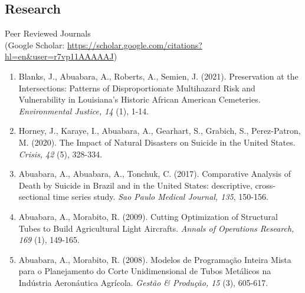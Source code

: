 \documentclass[11pt,oneside]{article}
\begin{document}
\subsection*{Research}

{Peer Reviewed Journals}\\{\small (Google Scholar: \url{https://scholar.google.com/citations?hl=en&user=r7vp11AAAAAJ})}
\begin{enumerate}[leftmargin=20pt]
\item Blanks, J., Abuabara, A., Roberts, A., Semien, J. (2021). Preservation at the Intersections: Patterns of Disproportionate Multihazard Risk and Vulnerability in Louisiana's Historic African American Cemeteries. \emph{Environmental Justice, 14} (1), 1-14.
\item Horney, J., Karaye, I., Abuabara, A., Gearhart, S., Grabich, S., Perez-Patron, M. (2020). The Impact of Natural Disasters on Suicide in the United States. \emph{Crisis, 42} (5), 328-334.
\item Abuabara, A., Abuabara, A., Tonchuk, C. (2017). Comparative Analysis of Death by Suicide in Brazil and in the United States: descriptive, cross-sectional time series study. \emph{Sao Paulo Medical Journal, 135}, 150-156.
\item Abuabara, A., Morabito, R. (2009). Cutting Optimization of Structural Tubes to Build Agricultural Light Aircrafts. \emph{Annals of Operations Research, 169} (1), 149-165.
\item Abuabara, A., Morabito, R. (2008). Modelos de Programação Inteira Mista para o Planejamento do Corte Unidimensional de Tubos Metálicos na Indústria Aeronáutica Agrícola. \emph{Gestão \& Produção, 15} (3), 605-617.
\end{enumerate}

\vspace{3pt}
\end{document}
